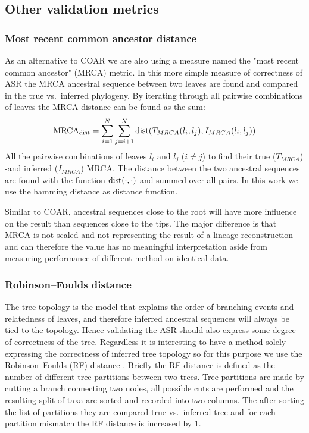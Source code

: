\subsection{Other validation metrics}

\subsubsection{Most recent common ancestor distance}
As an alternative to COAR we are also using a measure named the "most recent common ancestor" (MRCA) metric.
In this more simple measure of correctness of ASR the MRCA ancestral sequence between two leaves are found and compared in the true vs.\ inferred phylogeny.
By iterating through all pairwise combinations of leaves the MRCA distance can be found as the sum:
$$
\text{\text{MRCA}}_{\text{dist}} = \sum_{i=1}^{N} \sum_{j=i+1}^{N} \text{dist}(T_{MRCA}(l_i, l_j), I_{MRCA}(l_i, l_j))
$$
All the pairwise combinations of leaves $l_i$ and $l_j$ ($i \neq j$) to find their true ($T_{MRCA}$) -and inferred ($I_{MRCA}$) MRCA.
The distance between the two ancestral sequences are found with the function $\text{dist}(\cdot, \cdot)$ and summed over all pairs.
In this work we use the hamming distance as distance function.

Similar to COAR, ancestral sequences close to the root will have more influence on the result than sequences close to the tips.
The major difference is that MRCA is not scaled and not representing the result of a lineage reconstruction and can therefore the value has no meaningful interpretation aside from measuring performance of different method on identical data.


\subsubsection{Robinson–Foulds distance}
The tree topology is the model that explains the order of branching events and relatedness of leaves, and therefore inferred ancestral sequences will always be tied to the topology.
Hence validating the ASR should also express some degree of correctness of the tree.
Regardless it is interesting to have a method solely expressing the correctness of inferred tree topology so for this purpose we use the Robinson–Foulds (RF) distance \cite{robinson1981comparison}.
Briefly the RF distance is defined as the number of different tree partitions between two trees.
Tree partitions are made by cutting a branch connecting two nodes, all possible cuts are performed and the resulting split of taxa are sorted and recorded into two columns.
The after sorting the list of partitions they are compared true vs.\ inferred tree and for each partition mismatch the RF distance is increased by 1.



